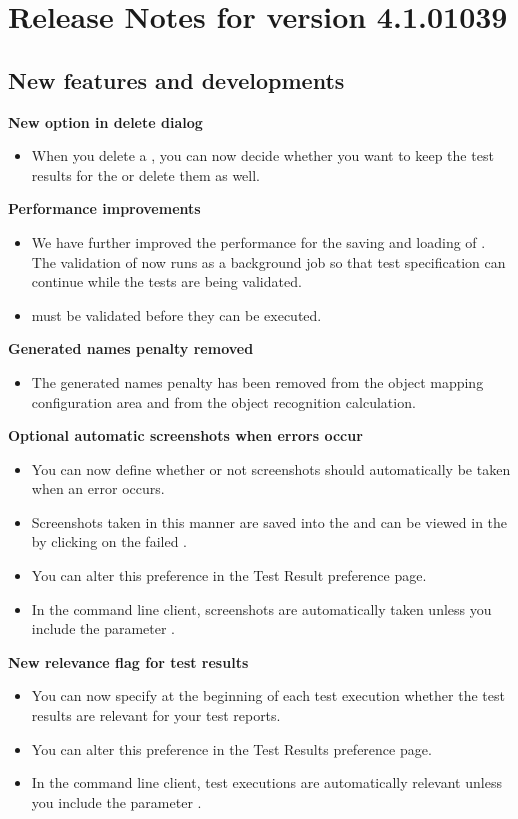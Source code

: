 \makeatletter
\section{Release Notes for version 4.1.01039}
\makeatother
\subsection{New features and developments}
\textbf{New option in delete \gdproject{} dialog}
\begin{itemize}
\item When you delete a \gdproject{}, you can now decide whether you want to keep the test results for the \gdproject{} or delete them as well.
\end{itemize}
\textbf{Performance improvements}
\begin{itemize}
\item We have further improved the performance for the saving and loading of \gdprojects{}. The validation of \gdsuites{} now runs as a background job so that test specification can continue while the tests are being validated.
\item \gdsuites{} must be validated before they can be executed. 
\end{itemize}
\textbf{Generated names penalty removed}
\begin{itemize}
\item The generated names penalty has been removed from the object mapping configuration area and from the object recognition calculation.
\end{itemize}
\textbf{Optional automatic screenshots when errors occur}
\begin{itemize}
\item You can now define whether or not screenshots should automatically be taken when an error occurs. 
\item Screenshots taken in this manner are saved into the \gddb{} and can be viewed in the \gdimgview{} by clicking on the failed \gdstep{}. 
\item You can alter this preference in the Test Result preference page. 
\item In the command line client, screenshots are automatically taken unless you include the parameter . 
\end{itemize}
\textbf{New relevance flag for test results}
\begin{itemize}
\item You can now specify at the beginning of each test execution whether the test results are relevant for your test reports. 
\item You can alter this preference in the Test Results preference page. 
\item In the command line client, test executions are automatically relevant unless you include the parameter . 
\end{itemize}
